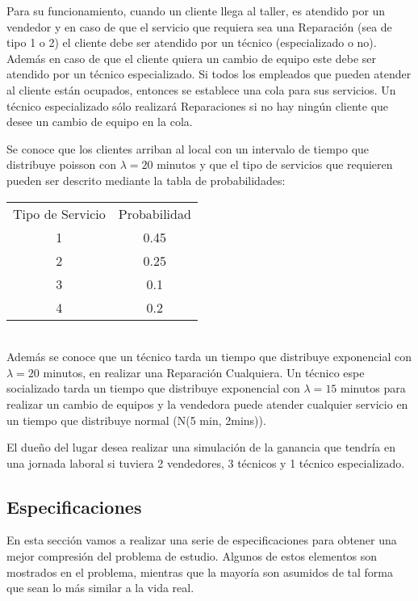 \documentclass[12pt]{article}
\begin{document}
Para su funcionamiento, cuando un cliente llega al taller, es atendido por
un vendedor y en caso de que el servicio que requiera sea una Reparación (sea de tipo 1 o 2) el cliente debe ser atendido por un técnico (especializado o no).
Además en caso de que el cliente quiera un cambio de equipo este debe ser atendido por un técnico especializado. Si todos los empleados que pueden atender al cliente están ocupados, entonces se establece una cola para sus servicios. Un técnico especializado sólo realizará Reparaciones si no hay ningún cliente que desee un cambio de equipo en la cola.

Se conoce que los clientes arriban al local con un intervalo de tiempo que
distribuye poisson con $\lambda = 20$ minutos y que el tipo de servicios que requieren pueden ser descrito mediante la tabla de probabilidades:\\

\begin{tabular}{cc}
 Tipo de Servicio & Probabilidad \\
      1           &       0.45      \\
      2           &       0.25      \\
      3           &       0.1     \\
      4           &       0.2   \\
\end{tabular}\\

Además se conoce que un técnico tarda un tiempo que distribuye exponencial con $\lambda = 20$ minutos, en realizar una Reparación Cualquiera. Un técnico espe socializado tarda un tiempo que distribuye exponencial con $\lambda = 15$ minutos para realizar un cambio de equipos y la vendedora puede atender cualquier servicio
en un tiempo que distribuye normal (N(5 min, 2mins)).

El dueño del lugar desea realizar una simulación de la ganancia que tendría en una jornada laboral si tuviera 2 vendedores, 3 técnicos y 1 técnico especializado.

\subsection*{Especificaciones}
En esta sección vamos a realizar una serie de especificaciones para obtener una mejor compresión del problema de estudio. Algunos de estos elementos son mostrados en el problema, mientras que la mayoría son  asumidos de tal forma que sean lo m\'as similar a la vida real.
\end{document}
